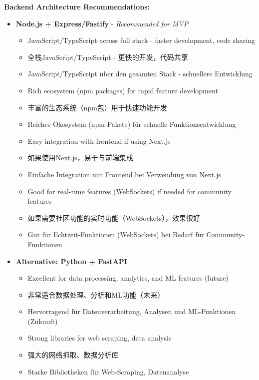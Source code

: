 \textbf{Backend Architecture Recommendations:}
\begin{itemize}
    \item \textbf{Node.js + Express/Fastify} - \textit{Recommended for MVP}
    \begin{itemize}
        \item JavaScript/TypeScript across full stack - faster development, code sharing
        \item 全栈JavaScript/TypeScript - 更快的开发，代码共享
        \item JavaScript/TypeScript über den gesamten Stack - schnellere Entwicklung
        \item Rich ecosystem (npm packages) for rapid feature development
        \item 丰富的生态系统（npm包）用于快速功能开发
        \item Reiches Ökosystem (npm-Pakete) für schnelle Funktionsentwicklung
        \item Easy integration with frontend if using Next.js
        \item 如果使用Next.js，易于与前端集成
        \item Einfache Integration mit Frontend bei Verwendung von Next.js
        \item Good for real-time features (WebSockets) if needed for community features
        \item 如果需要社区功能的实时功能（WebSockets），效果很好
        \item Gut für Echtzeit-Funktionen (WebSockets) bei Bedarf für Community-Funktionen
    \end{itemize}
    
    \item \textbf{Alternative: Python + FastAPI}
    \begin{itemize}
        \item Excellent for data processing, analytics, and ML features (future)
        \item 非常适合数据处理、分析和ML功能（未来）
        \item Hervorragend für Datenverarbeitung, Analysen und ML-Funktionen (Zukunft)
        \item Strong libraries for web scraping, data analysis
        \item 强大的网络抓取、数据分析库
        \item Starke Bibliotheken für Web-Scraping, Datenanalyse
    \end{itemize}
    

\end{itemize}

